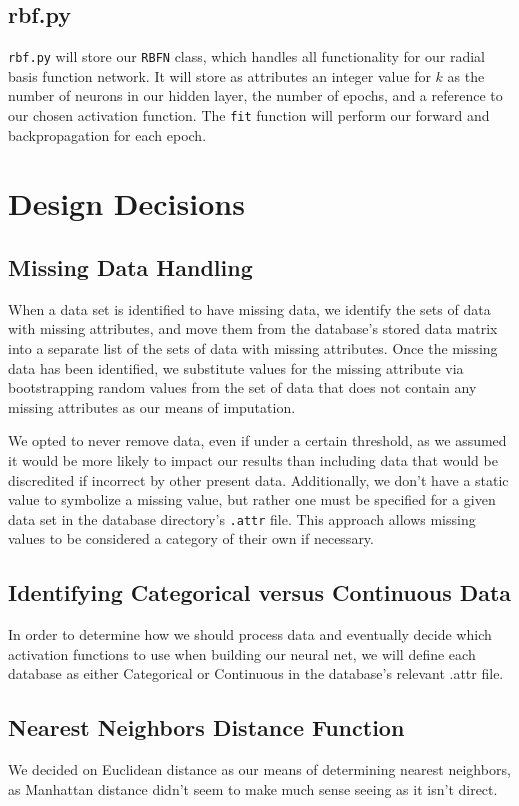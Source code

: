 \documentclass{article}
\begin{document}
\subsection*{rbf.py}
\texttt{rbf.py} will store our \texttt{RBFN} class, which handles all functionality for our radial basis function network. It will store as attributes an integer value for $k$ as the number of neurons in our hidden layer, the number of epochs, and a reference to our chosen activation function. The \texttt{fit} function will perform our forward and backpropagation for each epoch.

\section{Design Decisions}

\subsection*{Missing Data Handling}
When a data set is identified to have missing data, we identify the sets of data with missing attributes, and move them from the database's stored data matrix into a separate list of the sets of data with missing attributes. Once the missing data has been identified, we substitute values for the missing attribute via bootstrapping random values from the set of data that does not contain any missing attributes as our means of imputation.

We opted to never remove data, even if under a certain threshold, as we assumed it would be more likely to impact our results than including data that would be discredited if incorrect by other present data. 
Additionally, we don't have a static value to symbolize a missing value, but rather one must be specified for a given data set in the database directory's \texttt{.attr} file. This approach allows missing values to be considered a category of their own if necessary.

\subsection*{Identifying Categorical versus Continuous Data}
In order to determine how we should process data and eventually decide which activation functions to use when building our neural net, we will define each database as either Categorical or Continuous in the database's relevant .attr file.

\subsection*{Nearest Neighbors Distance Function}
We decided on Euclidean distance as our means of determining nearest neighbors, as Manhattan distance didn't seem to make much sense seeing as it isn't direct. 
\end{document}
